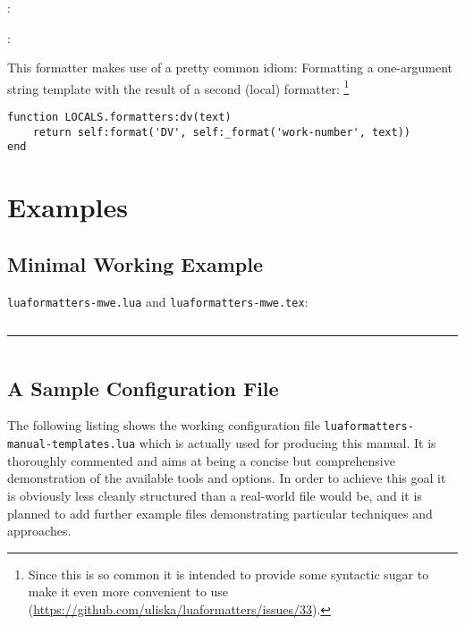 \documentclass[12pt]{scrartcl}
\begin{document}
\begin{itemize*}
\item {}
\item {}
\item \texttt{}: 
\item \texttt{}: 
\end{itemize*}

\noindent This formatter makes use of a pretty common idiom: Formatting a one-argument string template with the result of a second (local) formatter:%
\footnote{Since this is so common it is intended to provide some syntactic sugar
to make it even more convenient to use
(\url{https://github.com/uliska/luaformatters/issues/33}).}

\begin{verbatim}
function LOCALS.formatters:dv(text)
    return self:format('DV', self:_format('work-number', text))
end
\end{verbatim}


\section{Examples}
\label{sec:examples}

\subsection{Minimal Working Example}
\label{sec:examples:mwe}

\noindent
\texttt{luaformatters-mwe.lua} and \texttt{luaformatters-mwe.tex}:

\inputminted{lua}{examples/luaformatters-mwe.lua}

\hrule

\inputminted{tex}{examples/luaformatters-mwe.tex}





\subsection{A Sample Configuration File}
\label{sec:examples:manual-templates}

The following listing shows the working configuration file
\texttt{luaformatters-manual-templates.lua} which is actually used for producing
this manual. It is thoroughly commented and aims at being a concise but
comprehensive demonstration of the available tools and options.  In order to
achieve this goal it is obviously less cleanly structured than a real-world file
would be, and it is planned to add further example files demonstrating
particular techniques and approaches.
\end{document}
